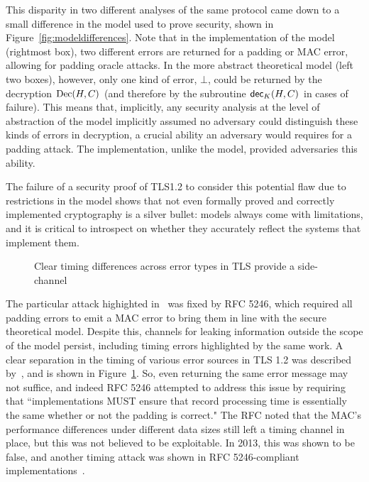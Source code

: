 This disparity in two different analyses of the same protocol came down to a small difference in the model used to prove security, shown in 
Figure~\ref{fig:modeldifferences}.  Note that in the implementation of the model (rightmost box), two different errors are returned for a padding or 
MAC error, allowing for padding oracle attacks.  In the more abstract theoretical model (left two boxes), however, only one kind of error, $\bot$, 
could be returned by the decryption $\textnormal{Dec}(H,C)$ (and therefore by the subroutine ${\sf dec}_K(H,C)$ in cases of failure).  This means that, 
implicitly, any security analysis at the level of abstraction of the model implicitly assumed no adversary could distinguish these kinds of errors in 
decryption, a crucial ability an adversary would requires for a padding attack.  The implementation, unlike the model, provided adversaries this 
ability.

The failure of a security proof of TLS1.2 to consider this potential flaw due to restrictions in the model shows that not even formally proved and 
correctly implemented cryptography is a silver bullet: models always come with limitations, and it is critical to introspect on whether they 
accurately reflect the systems that implement them.


\begin{figure}[h]
\centering
{}
  \caption{Clear timing differences across error types in TLS provide a side-channel}
\label{fig:timing}
\end{figure}

The particular attack highighted in~\cite{Canvel2003} was fixed by RFC 5246, which required all padding errors to emit a MAC error to bring them in 
line with the secure theoretical model.  Despite this, channels for leaking information outside the scope of the model persist, including timing 
errors highlighted by the same work.  A clear separation in the timing of various error sources in TLS 1.2 was described by~\cite{Canvel2003}, and is 
shown in Figure~\ref{fig:timing}.  So, even returning the same error message may not suffice, and indeed RFC 5246 attempted to address this issue by 
requiring that ``implementations MUST ensure that record processing time is essentially the same whether or not the padding is correct."  The RFC 
noted that the MAC's performance differences under different data sizes still left a timing channel in place, but this was not believed to be 
exploitable.  In 2013, this was shown to be false, and another timing attack was shown in RFC 5246-compliant implementations~\cite{Fardan2013}.

